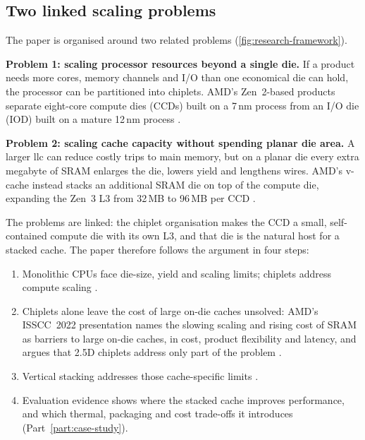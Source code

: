 \subsection{Two linked scaling problems}
\label{sec:two-problems}

The paper is organised around two related problems (\cref{fig:research-framework}).

\textbf{Problem 1: scaling processor resources beyond a single die.} If a product needs more cores, memory channels and I/O than one economical die can hold, the processor can be partitioned into \glspl{chiplet}. AMD's Zen~2-based products separate eight-core compute dies (CCDs) built on a 7\,nm process from an I/O die (IOD) built on a mature 12\,nm process \cite{naffziger2020chiplet,suggs2019zen2}.

\textbf{Problem 2: scaling cache capacity without spending planar die area.} A larger \gls{llc} can reduce costly trips to main memory, but on a planar die every extra megabyte of SRAM enlarges the die, lowers yield and lengthens wires. AMD's \gls{v-cache} instead stacks an additional SRAM die on top of the compute die, expanding the Zen~3 L3 from 32\,MB to 96\,MB per CCD \cite{wuu2022vcache,amd2022epyc7003}.

The problems are linked: the chiplet organisation makes the CCD a small, self-contained compute die with its own L3, and that die is the natural host for a stacked cache. The paper therefore follows the argument in four steps:

\begin{enumerate}
  \item Monolithic CPUs face die-size, yield and scaling limits; chiplets address compute scaling \cite{naffziger2020chiplet}.
  \item Chiplets alone leave the cost of large on-die caches unsolved: AMD's ISSCC~2022 presentation names the slowing scaling and rising cost of SRAM as barriers to large on-die caches, in cost, product flexibility and latency, and argues that 2.5D chiplets address only part of the problem \cite[slides~6--7]{wuu2022vcache}.
  \item Vertical stacking addresses those cache-specific limits \cite{wuu2022vcache,swaminathanAdvancedPackagingEnabling2021}.
  \item Evaluation evidence shows where the stacked cache improves performance, and which thermal, packaging and cost trade-offs it introduces (Part~\ref{part:case-study}).
\end{enumerate}

